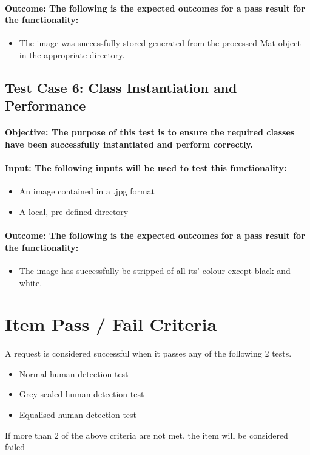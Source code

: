 \documentclass[a4paper,12pt]{report}
\begin{document}
	\paragraph{Outcome: The following is the expected outcomes for a pass result for the functionality:}
	\begin{itemize}
		\item The image was successfully stored generated from the processed Mat object in the appropriate directory.
	\end{itemize}
	
	\subsection{Test Case 6: Class Instantiation and Performance}
	\paragraph{Objective: The purpose of this test is to ensure the required classes have been successfully instantiated and perform correctly.}
	\paragraph{Input: The following inputs will be used to test this functionality:}
	\begin{itemize}
		\item An image contained in a .jpg format
		\item A local, pre-defined directory
	\end{itemize}
	\paragraph{Outcome: The following is the expected outcomes for a pass result for the functionality:}
	\begin{itemize}
		\item The image has successfully be stripped of all its' colour except black and white.
	\end{itemize}
		
\section{Item Pass / Fail Criteria}
	A request is considered successful when it passes any of the following 2 tests.
	\begin {itemize}
		\item Normal human detection test
		\item Grey-scaled human detection test
		\item Equalised human detection test
	\end {itemize}
	If more than 2 of the above criteria are not met, the item will be considered failed
	
\end{document}
